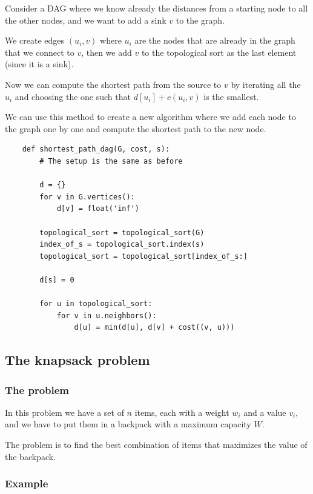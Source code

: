 \documentclass[12pt]{extarticle}
\begin{document}
Consider a DAG where we know already the distances from a starting node to all the other nodes, and we want to add a sink $v$ to the graph.

We create edges $(u_i, v)$ where $u_i$ are the nodes that are already in the graph that we connect to $v$, then we add $v$ to the topological sort as the last element (since it is a sink).

Now we can compute the shortest path from the source to $v$ by iterating all the $u_i$ and choosing the one such that $d[u_i] + c(u_i, v)$ is the smallest.

We can use this method to create a new algorithm where we add each node to the graph one by one and compute the shortest path to the new node.

\begin{verbatim}
    def shortest_path_dag(G, cost, s):
        # The setup is the same as before

        d = {}
        for v in G.vertices():
            d[v] = float('inf')

        topological_sort = topological_sort(G)
        index_of_s = topological_sort.index(s)
        topological_sort = topological_sort[index_of_s:]

        d[s] = 0

        for u in topological_sort:
            for v in u.neighbors():
                d[u] = min(d[u], d[v] + cost((v, u)))

\end{verbatim}

\subsection{The knapsack problem}

\subsubsection{The problem}

In this problem we have a set of $n$ items, each with a weight $w_i$ and a value $v_i$, and we have to put them in a backpack with a maximum capacity $W$.

The problem is to find the best combination of items that maximizes the value of the backpack.

\subsubsection{Example}
\end{document}
